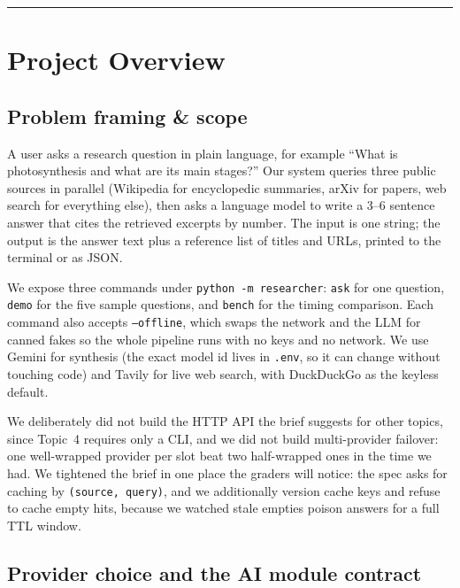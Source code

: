 \documentclass[11pt,a4paper]{article}
\begin{document}
\tableofcontents
\vspace{0.6em}\hrule\vspace{0.4em}

\section{Project Overview}

\subsection{Problem framing \& scope}

A user asks a research question in plain language, for example ``What is photosynthesis and what are its main stages?'' Our system queries three public sources in parallel (Wikipedia for encyclopedic summaries, arXiv for papers, web search for everything else), then asks a language model to write a 3--6 sentence answer that cites the retrieved excerpts by number. The input is one string; the output is the answer text plus a reference list of titles and URLs, printed to the terminal or as JSON.

We expose three commands under \texttt{python -m researcher}: \texttt{ask} for one question, \texttt{demo} for the five sample questions, and \texttt{bench} for the timing comparison. Each command also accepts \texttt{--offline}, which swaps the network and the LLM for canned fakes so the whole pipeline runs with no keys and no network. We use Gemini for synthesis (the exact model id lives in \texttt{.env}, so it can change without touching code) and Tavily for live web search,
with DuckDuckGo as the keyless default.

We deliberately did not build the HTTP API the brief suggests for other topics, since Topic~4 requires only a CLI, and we did not build multi-provider failover: one well-wrapped provider per slot beat two half-wrapped ones in the time we had. We tightened the brief in one place the graders will notice: the spec asks for caching by \texttt{(source, query)}, and we additionally version cache keys and refuse to cache empty hits, because we watched stale empties poison answers for a full TTL window.

\subsection{Provider choice and the AI module contract}
\end{document}
